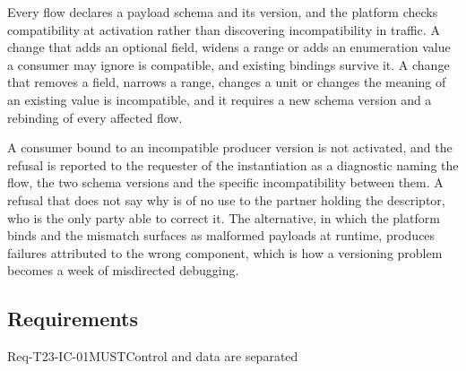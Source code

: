 Every flow declares a payload schema and its version, and the platform
checks compatibility at activation rather than discovering
incompatibility in traffic. A change that adds an optional field, widens
a range or adds an enumeration value a consumer may ignore is
compatible, and existing bindings survive it. A change that removes a
field, narrows a range, changes a unit or changes the meaning of an
existing value is incompatible, and it requires a new schema version and
a rebinding of every affected flow.

A consumer bound to an incompatible producer version is not activated,
and the refusal is reported to the requester of the instantiation as a
diagnostic naming the flow, the two schema versions and the specific
incompatibility between them. A refusal that does not say why is of no
use to the partner holding the descriptor, who is the only party able to
correct it. The alternative, in which the platform binds and the
mismatch surfaces as malformed payloads at runtime, produces failures
attributed to the wrong component, which is how a versioning problem
becomes a week of misdirected debugging.

\hypertarget{requirements-5}{%
\subsection{Requirements}\label{requirements-5}}

\begin{requirement}{Req-T23-IC-01}{MUST}{Control and data are separated}
\end{requirement}

